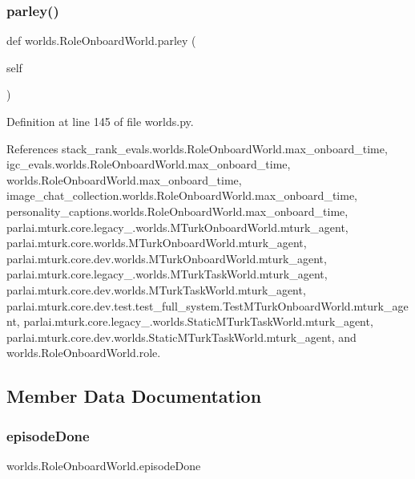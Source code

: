 \subsubsection{\texorpdfstring{parley()}{parley()}}
{\footnotesize\ttfamily def worlds.\+Role\+Onboard\+World.\+parley (\begin{DoxyParamCaption}\item[{}]{self }\end{DoxyParamCaption})}



Definition at line 145 of file worlds.\+py.



References stack\+\_\+rank\+\_\+evals.\+worlds.\+Role\+Onboard\+World.\+max\+\_\+onboard\+\_\+time, igc\+\_\+evals.\+worlds.\+Role\+Onboard\+World.\+max\+\_\+onboard\+\_\+time, worlds.\+Role\+Onboard\+World.\+max\+\_\+onboard\+\_\+time, image\+\_\+chat\+\_\+collection.\+worlds.\+Role\+Onboard\+World.\+max\+\_\+onboard\+\_\+time, personality\+\_\+captions.\+worlds.\+Role\+Onboard\+World.\+max\+\_\+onboard\+\_\+time, parlai.\+mturk.\+core.\+legacy\+\_.\+worlds.\+M\+Turk\+Onboard\+World.\+mturk\+\_\+agent, parlai.\+mturk.\+core.\+worlds.\+M\+Turk\+Onboard\+World.\+mturk\+\_\+agent, parlai.\+mturk.\+core.\+dev.\+worlds.\+M\+Turk\+Onboard\+World.\+mturk\+\_\+agent, parlai.\+mturk.\+core.\+legacy\+\_.\+worlds.\+M\+Turk\+Task\+World.\+mturk\+\_\+agent, parlai.\+mturk.\+core.\+dev.\+worlds.\+M\+Turk\+Task\+World.\+mturk\+\_\+agent, parlai.\+mturk.\+core.\+dev.\+test.\+test\+\_\+full\+\_\+system.\+Test\+M\+Turk\+Onboard\+World.\+mturk\+\_\+agent, parlai.\+mturk.\+core.\+legacy\+\_.\+worlds.\+Static\+M\+Turk\+Task\+World.\+mturk\+\_\+agent, parlai.\+mturk.\+core.\+dev.\+worlds.\+Static\+M\+Turk\+Task\+World.\+mturk\+\_\+agent, and worlds.\+Role\+Onboard\+World.\+role.



\subsection{Member Data Documentation}
\mbox{\label{classworlds_1_1RoleOnboardWorld_a72c09a6b49ffa39e2fd2a9288a0eb5ab}} 
\subsubsection{\texorpdfstring{episode\+Done}{episodeDone}}
{\footnotesize\ttfamily worlds.\+Role\+Onboard\+World.\+episode\+Done}




